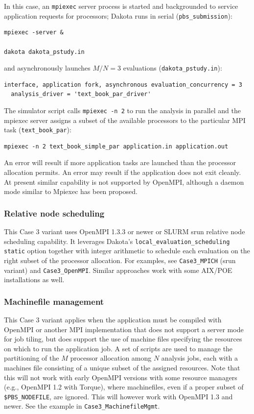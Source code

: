 In this case, an {\tt mpiexec} server process is started and
backgrounded to service application requests for processors; Dakota
runs in serial ({\tt pbs\_submission}):
\begin{verbatim}
mpiexec -server &

dakota dakota_pstudy.in
\end{verbatim}
and asynchronously launches $M/N=3$ evaluations ({\tt dakota\_pstudy.in}):
\begin{verbatim}
interface, application fork, asynchronous evaluation_concurrency = 3
  analysis_driver = 'text_book_par_driver'
\end{verbatim}
The simulator script calls {\tt mpiexec -n 2} to run the analysis in
parallel and the mpiexec server assigns a subset of the available
processors to the particular MPI task ({\tt text\_book\_par}):
\begin{verbatim}
mpiexec -n 2 text_book_simple_par application.in application.out
\end{verbatim}
An error will result if more application tasks are launched than the
processor allocation permits.  An error may result if the application
does not exit cleanly.  At present similar capability is not supported
by OpenMPI, although a daemon mode similar to Mpiexec has been
proposed.

\subsubsection{Relative node scheduling}

This Case 3 variant uses OpenMPI 1.3.3 or newer or SLURM srun relative
node scheduling capability.  It leverages Dakota's
\texttt{local\_evaluation\_scheduling static} option together with
integer arithmetic to schedule each evaluation on the right subset of
the processor allocation.  For examples, see \texttt{Case3\_MPICH}
(srun variant) and \texttt{Case3\_OpenMPI}.  Similar approaches work
with some AIX/POE installations as well.

\subsubsection{Machinefile management}

This Case 3 variant applies when the application must be compiled with
OpenMPI or another MPI implementation that does not support a server
mode for job tiling, but does support the use of machine files
specifying the resources on which to run the application job.  A set
of scripts are used to manage the partitioning of the $M$ processor
allocation among $N$ analysis jobs, each with a machines file
consisting of a unique subset of the assigned resources.  Note that
this will not work with early OpenMPI versions with some resource
managers (e.g., OpenMPI 1.2 with Torque), where machinefiles, even if
a proper subset of {\tt \$PBS\_NODEFILE}, are ignored.  This will
however work with OpenMPI 1.3 and newer.  See the example in
\texttt{Case3\_MachinefileMgmt}.

